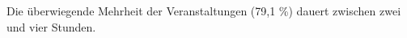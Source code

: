 

Die überwiegende Mehrheit der Veranstaltungen (79,1 \%) dauert zwischen zwei und vier Stunden.



